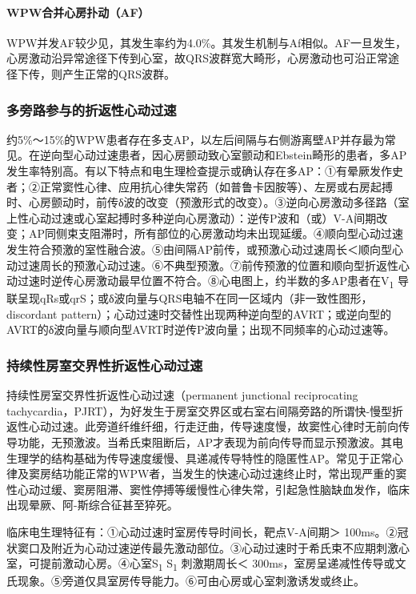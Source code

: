 \paragraph{WPW合并心房扑动（AF）}

WPW并发AF较少见，其发生率约为4.0\%。其发生机制与Af相似。AF一旦发生，心房激动沿异常途径下传到心室，故QRS波群宽大畸形，心房激动也可沿正常途径下传，则产生正常的QRS波群。

\subsubsection{多旁路参与的折返性心动过速}

约5\%～15\%的WPW患者存在多支AP，以左后间隔与右侧游离壁AP并存最为常见。在逆向型心动过速患者，因心房颤动致心室颤动和Ebstein畸形的患者，多AP发生率特别高。有以下特点和电生理检查提示或确认存在多AP：①有晕厥发作史者；②正常窦性心律、应用抗心律失常药（如普鲁卡因胺等）、左房或右房起搏时、心房颤动时，前传δ波的改变（预激形式的改变）。③逆向心房激动多径路（室上性心动过速或心室起搏时多种逆向心房激动）：逆传P波和（或）V-A间期改变；AP同侧束支阻滞时，所有部位的心房激动均未出现延缓。④顺向型心动过速发生符合预激的室性融合波。⑤由间隔AP前传，或预激心动过速周长＜顺向型心动过速周长的预激心动过速。⑥不典型预激。⑦前传预激的位置和顺向型折返性心动过速时逆传心房激动最早位置不符合。⑧心电图上，约半数的多AP患者在V\textsubscript{1}
导联呈现qRs或qrS；或δ波向量与QRS电轴不在同一区域内（非一致性图形，discordant
pattern）；心动过速时交替性出现两种逆向型的AVRT；或逆向型的AVRT的δ波向量与顺向型AVRT时逆传P波向量；出现不同频率的心动过速等。

\subsubsection{持续性房室交界性折返性心动过速}

持续性房室交界性折返性心动过速（permanent junctional reciprocating
tachycardia，PJRT），为好发生于房室交界区或右室右间隔旁路的所谓快-慢型折返性心动过速。此旁道纤维纤细，行走迂曲，传导速度慢，故窦性心律时无前向传导功能，无预激波。当希氏束阻断后，AP才表现为前向传导而显示预激波。其电生理学的结构基础为传导速度缓慢、具递减传导特性的隐匿性AP。常见于正常心律及窦房结功能正常的WPW者，当发生的快速心动过速终止时，常出现严重的窦性心动过缓、窦房阻滞、窦性停搏等缓慢性心律失常，引起急性脑缺血发作，临床出现晕厥、阿-斯综合征甚至猝死。

临床电生理特征有：①心动过速时室房传导时间长，靶点V-A间期＞
100ms。②冠状窦口及附近为心动过速逆传最先激动部位。③心动过速时于希氏束不应期刺激心室，可提前激动心房。④心室S\textsubscript{1}
S\textsubscript{1} 刺激期周长＜
300ms，室房呈递减性传导或文氏现象。⑤旁道仅具室房传导能力。⑥可由心房或心室刺激诱发或终止。

